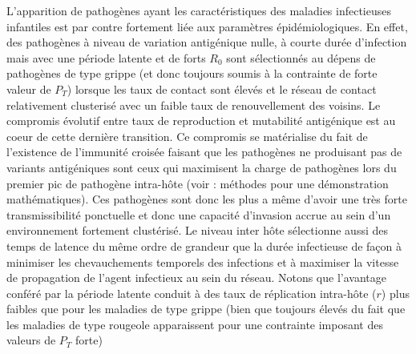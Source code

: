 
L'apparition de pathogènes ayant les caractéristiques des maladies
infectieuses infantiles est par contre fortement liée aux paramètres
épidémiologiques. En effet, des pathogènes à niveau de variation
antigénique nulle, à courte durée d'infection mais avec une période
latente et de forts $R_0$ sont sélectionnés au dépens de pathogènes de
type grippe (et donc toujours soumis à la contrainte de forte valeur
de $P_T$) lorsque les taux de contact sont élevés et le réseau de
contact relativement clusterisé avec un faible taux de renouvellement
des voisins. Le compromis évolutif entre taux de reproduction et
mutabilité antigénique est au coeur de cette dernière transition. Ce
compromis se matérialise du fait de l'existence de l'immunité croisée
faisant que les pathogènes ne produisant pas de variants antigéniques
sont ceux qui maximisent la charge de pathogènes lors du premier pic
de pathogène intra-hôte (voir \citet{Lange2009}: méthodes pour une
démonstration mathématiques). Ces pathogènes sont donc les plus a même
d'avoir une très forte transmissibilité ponctuelle et donc une
capacité d'invasion accrue au sein d'un environnement fortement
clustérisé. Le niveau inter hôte sélectionne aussi des temps de
latence du même ordre de grandeur que la durée infectieuse de façon à
minimiser les chevauchements temporels des infections et à maximiser
la vitesse de propagation de l'agent infectieux au sein du réseau.
Notons que l'avantage conféré par la période latente conduit à des
taux de réplication intra-hôte ($r$) plus faibles que pour les
maladies de type grippe (bien que toujours élevés du fait que les
maladies de type rougeole apparaissent pour une contrainte imposant
des valeurs de $P_T$ forte)

